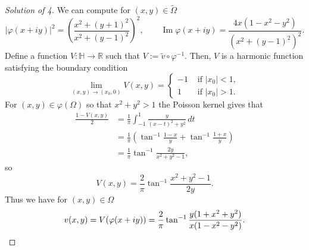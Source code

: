 \documentclass[a4paper]{article}
\theoremstyle{definition}
\renewcommand{\Im}{\operatorname{Im}}
\renewcommand{\H}{\mathbb{H}}
\newcommand{\R}{\mathbb{R}}
\newcommand{\f}{\varphi}
\renewcommand{\tilde}{\widetilde}
\begin{document}
\begin{proof}[Solution of 4]
We can compute for $(x,y)\in\tilde\Omega$
\[|\f(x+iy)|^2=\left(\frac{x^2+(y+1)^2}{x^2+(y-1)^2}\right)^2,\qquad\Im\f(x+iy)=\frac{4x(1-x^2-y^2)}{(x^2+(y-1)^2)^2}.\]
Define a function $V:\H\to\R$ such that $V:=\tilde v\circ\f^{-1}$.
Then, $V$ is a harmonic function satisfying the boundary condition
\[\lim_{(x,y)\to(x_0,0)}V(x,y)=\begin{cases}-1&\text{ if }|x_0|<1,\\1&\text{ if }|x_0|>1.\end{cases}\]
For $(x,y)\in\f(\Omega)$ so that $x^2+y^2>1$ the Poisson kernel gives that
\begin{align*}
\frac{1-V(x,y)}2
&=\frac1\pi\int_{-1}^1\frac y{(x-t)^2+y^2}\,dt\\
&=\frac1\pi\left(\tan^{-1}\frac{1-x}y+\tan^{-1}\frac{1+x}y\right)\\
&=\frac1\pi\tan^{-1}\frac{2y}{x^2+y^2-1},
\end{align*}
so
\[V(x,y)=\frac2\pi\tan^{-1}\frac{x^2+y^2-1}{2y}.\]
Thus we have for $(x,y)\in\Omega$
\[v(x,y)=V(\f(x+iy))=\frac2\pi\tan^{-1}\frac{y(1+x^2+y^2)}{x(1-x^2-y^2)}.\qedhere\]
\end{proof}
\end{document}
